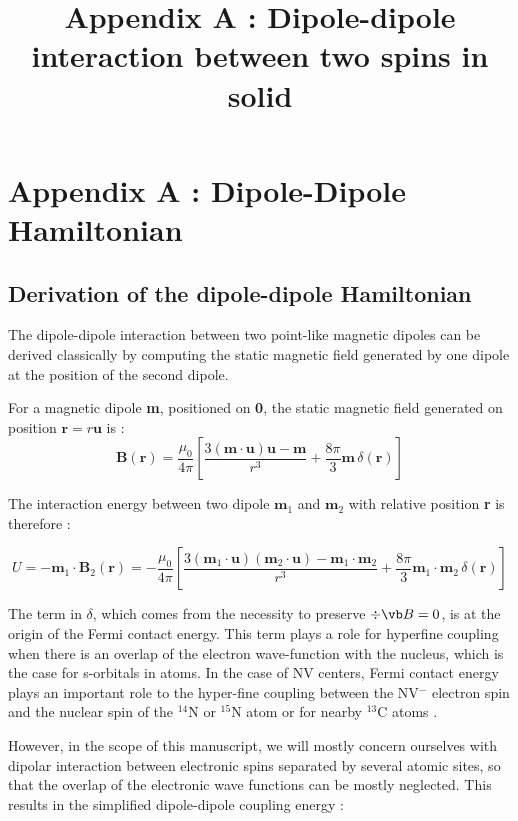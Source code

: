 \documentclass[a4paper]{report}
\title{Appendix A : Dipole-dipole interaction between two spins in solid}
\begin{document}
\chapter{Appendix A : Dipole-Dipole Hamiltonian}
\section{Derivation of the dipole-dipole Hamiltonian}
The dipole-dipole interaction between two point-like magnetic dipoles can be derived classically by computing the static magnetic field generated by one dipole at the position of the second dipole.

For a magnetic dipole \textbf{m}, positioned on \textbf{0}, the static magnetic field generated on position $\mathbf{r}=r\mathbf{u}$ is : \cite[p.~188]{jackson1999classical} 
\begin{equation}
\mathbf{B}(\mathbf{r})=\frac{\mu_0}{4 \pi}\left[ \frac{3 (\mathbf{m}\cdot\mathbf{u})\mathbf{u} - \mathbf{m}}{r^3}+\frac{8\pi}{3}\mathbf{m}\,\delta(\mathbf{r})\right]
\end{equation}

The interaction energy between two dipole $\mathbf{m}_1$ and $\mathbf{m}_2$ with relative position \textbf{r} is therefore :

\begin{equation}
U=-\mathbf{m}_1 \cdot \mathbf{B}_2(\mathbf{r})=-\frac{\mu_0}{4 \pi}\left[ \frac{3 (\mathbf{m}_1\cdot\mathbf{u})(\mathbf{m}_2\cdot\mathbf{u}) - \mathbf{m}_1\cdot\mathbf{m}_2}{r^3}+\frac{8\pi}{3}\mathbf{m}_1\cdot\mathbf{m}_2\,\delta(\mathbf{r})\right]
\end{equation}

The term in $\delta$, which comes from the necessity to preserve $\div{\vb B}=0$, is at the origin of the Fermi contact energy. This term plays a role for hyperfine coupling when there is an overlap of the electron wave-function with the nucleus, which is the case for s-orbitals in atoms. In the case of NV centers, Fermi contact energy plays an important role to the hyper-fine coupling between the NV$^-$ electron spin and the nuclear spin of the $^{14}$N or $^{15}$N atom \cite{doherty2012theory} or for nearby $^{13}$C atoms \cite{smeltzer201113c}.

However, in the scope of this manuscript, we will mostly concern ourselves with dipolar interaction between electronic spins separated by several atomic sites, so that the overlap of the electronic wave functions can be mostly neglected. This results in the simplified dipole-dipole coupling energy :
\end{document}
